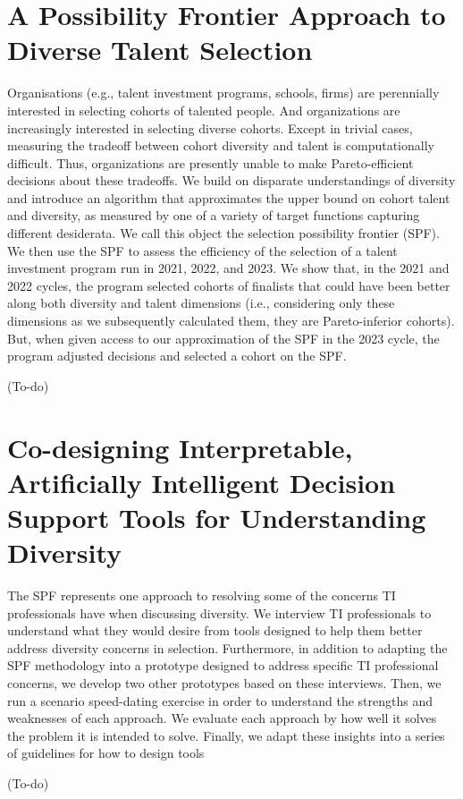 \section{A Possibility Frontier Approach to Diverse Talent Selection} %
Organisations (e.g., talent investment programs, schools, firms) are perennially interested in selecting cohorts of talented people. And organizations are increasingly interested in selecting diverse cohorts. Except in trivial cases, measuring the tradeoff between cohort diversity and talent is computationally difficult. Thus, organizations are presently unable to make Pareto-efficient decisions about these tradeoffs. We build on disparate understandings of diversity and introduce an algorithm that approximates the upper bound on cohort talent and diversity, as measured by one of a variety of target functions capturing different desiderata. We call this object the selection possibility frontier (SPF). We then use the SPF to assess the efficiency of the selection of a talent investment program run in 2021, 2022, and 2023. We show that, in the 2021 and 2022 cycles, the program selected cohorts of finalists that could have been better along both diversity and talent dimensions (i.e., considering only these dimensions as we subsequently calculated them, they are Pareto-inferior cohorts). But, when given access to our approximation of the SPF in the 2023 cycle, the program adjusted decisions and selected a cohort on the SPF.

(To-do)

\section{Co-designing Interpretable, Artificially Intelligent Decision Support Tools for Understanding Diversity}
The SPF represents one approach to resolving some of the concerns TI professionals have when discussing diversity. We interview TI professionals to understand what they would desire from tools designed to help them better address diversity concerns in selection. Furthermore, in addition to adapting the SPF methodology into a prototype designed to address specific TI professional concerns, we develop two other prototypes based on these interviews. Then, we run a scenario speed-dating exercise in order to understand the strengths and weaknesses of each approach. We evaluate each approach by how well it solves the problem it is intended to solve. Finally, we adapt these insights into a series of guidelines for how to design tools 

(To-do)